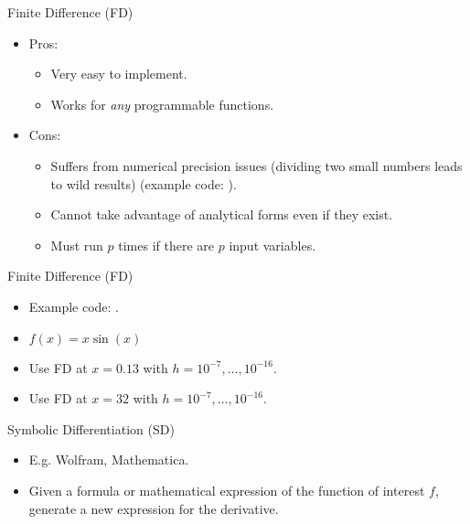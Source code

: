 \begin{frame}{Finite Difference (FD)}
\begin{itemize}
    \item Pros:
    \begin{itemize}
        \item Very easy to implement.
        \item Works for \emph{any} programmable functions.
    \end{itemize}
    \item Cons:
    \begin{itemize}
        \item Suffers from numerical precision issues (dividing two small numbers leads to wild results) 
            (example code: \href{https://github.com/JamesYang007/FastAD-Report/blob/master/slides/stanford-01272022/examples/src/fd_prec.cpp}{}).
        \item Cannot take advantage of analytical forms even if they exist.
        \item Must run $p$ times if there are $p$ input variables.
    \end{itemize}
\end{itemize}
\end{frame}

\begin{frame}{Finite Difference (FD)}
\begin{itemize}
        \item Example code: \href{https://github.com/JamesYang007/FastAD-Report/blob/master/slides/stanford-01272022/examples/src/fd_prec.cpp}{}.
        \item $f(x) = x \sin(x)$
        \item Use FD at $x = 0.13$ with $h=10^{-7},\ldots, 10^{-16}$.
        \item Use FD at $x = 32$ with $h=10^{-7},\ldots, 10^{-16}$.
\end{itemize}
\end{frame}

\begin{frame}{Symbolic Differentiation (SD)}
\begin{itemize}
    \item E.g. Wolfram, Mathematica.
    \item Given a formula or mathematical expression of the function of interest $f$,
    generate a new expression for the derivative.
\end{itemize}
\end{frame}

